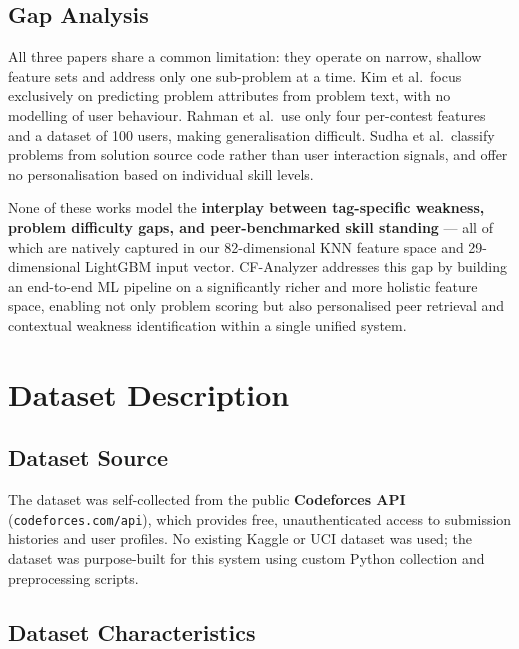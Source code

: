 \documentclass[12pt,a4paper]{article}
\begin{document}
\subsection{Gap Analysis}
 
All three papers share a common limitation: they operate on narrow,
shallow feature sets and address only one sub-problem at a time.
Kim et al.\ focus exclusively on predicting problem attributes from
problem text, with no modelling of user behaviour.
Rahman et al.\ use only four per-contest features and a dataset of
100 users, making generalisation difficult.
Sudha et al.\ classify problems from solution source code rather than
user interaction signals, and offer no personalisation based on individual
skill levels.
 
None of these works model the \textbf{interplay between tag-specific
weakness, problem difficulty gaps, and peer-benchmarked skill standing}
— all of which are natively captured in our 82-dimensional KNN feature
space and 29-dimensional LightGBM input vector.
CF-Analyzer addresses this gap by building an end-to-end ML pipeline on
a significantly richer and more holistic feature space, enabling not only
problem scoring but also personalised peer retrieval and contextual
weakness identification within a single unified system.


\section{Dataset Description}

\subsection*{Dataset Source}

The dataset was self-collected from the public \textbf{Codeforces API}
(\texttt{codeforces.com/api}), which provides free, unauthenticated access to
submission histories and user profiles. No existing Kaggle or UCI dataset was used;
the dataset was purpose-built for this system using custom Python collection and
preprocessing scripts.

\subsection*{Dataset Characteristics}
\end{document}
